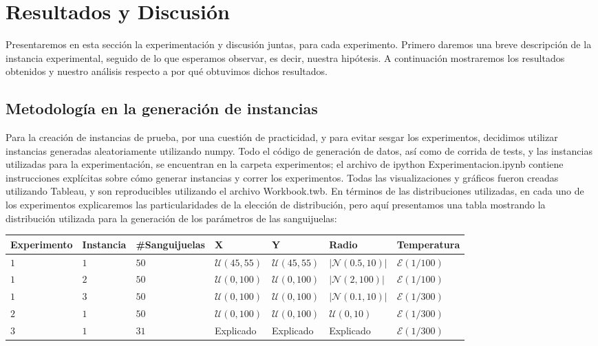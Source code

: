 \section{Resultados y Discusión}

Presentaremos en esta sección la experimentación y discusión juntas, para cada experimento. Primero daremos una breve descripción de la instancia experimental, seguido de lo que esperamos observar, es decir, nuestra hipótesis. A continuación mostraremos los 
resultados obtenidos y nuestro análisis respecto a por qué obtuvimos dichos resultados.

\subsection{Metodología en la generación de instancias}

Para la creación de instancias de prueba, por una cuestión de practicidad, y para evitar sesgar los experimentos, decidimos utilizar instancias generadas aleatoriamente utilizando numpy. Todo el código de generación de datos, así como de corrida de tests, y las instancias utilizadas para la experimentación, se encuentran en la carpeta experimentos; el archivo de ipython Experimentacion.ipynb contiene instrucciones explícitas sobre cómo generar instancias y correr los experimentos. Todas las visualizaciones y gráficos fueron creadas utilizando Tableau, y son reproducibles utilizando el archivo Workbook.twb. En términos de las distribuciones utilizadas, en cada uno de los experimentos explicaremos las particularidades de la elección de distribución, pero aquí presentamos una tabla mostrando la distribución utilizada para la generación de los parámetros de las sanguijuelas:

\begin{center}
\begin{tabular}{l | l | l | l | l | l | l}
Experimento & Instancia & \#Sanguijuelas & X & Y & Radio & Temperatura\\ \hline
$1$ & $1$ & $50$ & $\mathcal{U}(45, 55)$ & $\mathcal{U}(45, 55)$ & $|\mathcal{N}(0.5, 10)|$ & $\mathcal{E}(1/100)$\\ \hline
$1$ & $2$ & $50$ & $\mathcal{U}(0, 100)$ & $\mathcal{U}(0, 100)$ & $|\mathcal{N}(2, 100)|$ & $\mathcal{E}(1/100)$\\ \hline
$1$ & $3$ & $50$ & $\mathcal{U}(0, 100)$ & $\mathcal{U}(0, 100)$ & $|\mathcal{N}(0.1, 10)|$ & $\mathcal{E}(1/300)$\\ \hline
$2$ & $1$ & $50$ & $\mathcal{U}(0, 100)$ & $\mathcal{U}(0, 100)$ & $\mathcal{U}(0, 10)$ & $\mathcal{E}(1/300)$\\ \hline
$3$ & $1$ & $31$ & Explicado & Explicado & Explicado & $\mathcal{E}(1/300)$\\ \hline
\end{tabular}
\end{center}

